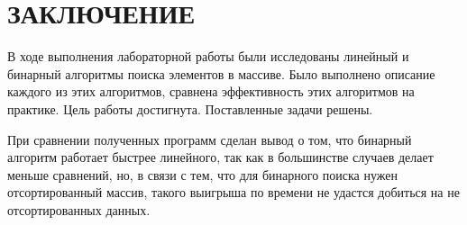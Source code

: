 \part*{ЗАКЛЮЧЕНИЕ}
В ходе выполнения лабораторной работы были исследованы линейный и бинарный алгоритмы поиска элементов в массиве. Было выполнено описание каждого из этих алгоритмов, сравнена эффективность этих алгоритмов на практике. Цель работы достигнута. Поставленные задачи решены.

При сравнении полученных программ сделан вывод о том, что бинарный алгоритм работает
быстрее линейного, так как в большинстве случаев делает меньше сравнений, но, в связи
с тем, что для бинарного поиска нужен отсортированный массив, такого выигрыша по
времени не удастся добиться на не отсортированных данных.